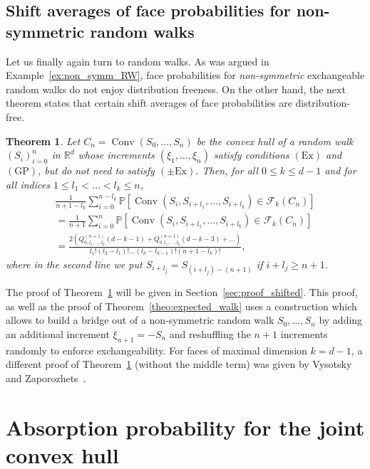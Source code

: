\documentclass[12pt, reqno]{amsart}
\theoremstyle{plain}
\newtheorem{theorem}{Theorem}[section]
\theoremstyle{definition}
\theoremstyle{remark}
\begin{document}
\subsection{Shift averages of face probabilities for non-symmetric random walks}
Let us finally again turn to random walks. As was argued in Example~\ref{ex:non_symm_RW}, face probabilities for \emph{non-symmetric} exchangeable random walks do not enjoy distribution freeness. On the other hand, the next theorem states that certain shift averages of face probabilities are distribution-free.
\begin{theorem}\label{theo:1139}
Let $C_n={\mathop{\mathrm{Conv}}\nolimits}(S_0,\ldots,S_n)$ be the convex hull of a random walk $(S_i)_{i=0}^n$ in ${\mathbb{R}}^d$ whose increments $(\xi_1,\ldots,\xi_n)$ satisfy conditions $(\text{Ex})$ and $(\text{GP})$, but do not need to satisfy $(\pm\text{Ex})$.
Then, for all $0\leq k \leq d-1$ and for all indices $1\leq l_1 < \ldots < l_k \leq n$,
\begin{multline*}
\frac 1 {n+1-l_k} \sum_{i=0}^{n-l_k} {\mathbb{P}}[{\mathop{\mathrm{Conv}}\nolimits}(S_{i}, S_{i+l_1},\ldots, S_{i+l_{k}})\in {\mathcal{F}}_k(C_n)]
\\=
\frac 1 {n+1} \sum_{i=0}^{n} {\mathbb{P}}[{\mathop{\mathrm{Conv}}\nolimits}(S_{i}, S_{i+l_1},\ldots, S_{i+l_{k}})\in {\mathcal{F}}_k(C_n)]
\\=
\frac{
2(Q_{0, l_1,\ldots,l_{k}}^{(n+1)}(d-k-1) + Q_{0,l_1,\ldots,l_{k}}^{(n+1)}(d-k-3)+\ldots)
}{l_1! (l_2-l_1)!\ldots  (l_{k}-l_{k-1})! (n+1-l_{k})!},
\end{multline*}
where in the second line we put $S_{i+l_j} = S_{(i+l_j)-(n+1)}$ if $i+l_j\geq n+1$.
\end{theorem}
The proof of Theorem~\ref{theo:1139}  will be given in Section~\ref{sec:proof_shifted}. This proof, as well as the proof of Theorem~\ref{theo:expected_walk} uses a construction which allows to build a bridge out of a non-symmetric random walk $S_0,\ldots,S_n$ by adding an additional increment $\xi_{n+1} = -S_n$ and reshuffling the $n+1$ increments randomly to enforce exchangeability.
For faces of maximal dimension $k=d-1$, a different proof of Theorem~\ref{theo:1139} (without the middle term)  was given by Vysotsky and Zaporozhets~\cite{vysotsky_zaporozhets}.

 

\section{Absorption probability for the joint convex hull}
\end{document}
